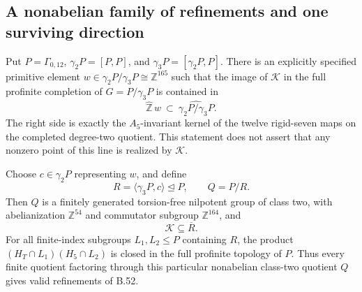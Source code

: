 \subsection*{A nonabelian family of refinements and one surviving direction}

Put $P=\Gamma_{0,12}$, $\gamma_2P=[P,P]$, and
$\gamma_3P=[\gamma_2P,P]$.  There is an explicitly specified primitive
element $w\in\gamma_2P/\gamma_3P\cong\mathbb Z^{165}$ such that
the image of $\mathcal K$ in the full profinite completion of
$G=P/\gamma_3P$ is contained in
\[
                    \widehat{\mathbb Z}\,w
          \ \subset\ \widehat{\gamma_2P/\gamma_3P}.
                                                               \tag{B.59.1}
\]
The right side is exactly the $A_5$-invariant kernel of the twelve
rigid-seven maps on the completed degree-two quotient.
This statement does not assert that any nonzero point of this line
is realized by $\mathcal K$.

Choose $c\in\gamma_2P$ representing $w$, and define
\[
 R=\langle\gamma_3P,c\rangle\trianglelefteq P,
 \qquad Q=P/R.
                                                               \tag{B.59.2}
\]
Then $Q$ is a finitely generated torsion-free nilpotent group of
class two, with abelianization $\mathbb Z^{54}$ and commutator
subgroup $\mathbb Z^{164}$, and
\[
              \mathcal K\subseteq\overline R.
                                                               \tag{B.59.3}
\]
For all finite-index subgroups $L_1,L_2\leq P$ containing $R$,
the product $(H_T\cap L_1)(H_5\cap L_2)$ is closed in the full
profinite topology of $P$.  Thus every finite quotient factoring
through this particular nonabelian class-two quotient $Q$
gives valid refinements of B.52.

